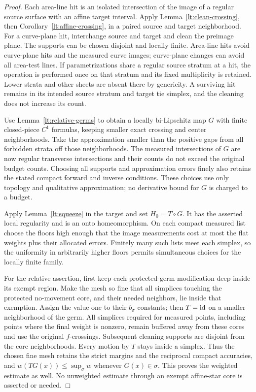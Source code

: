 \begin{proof}
Each area-line hit is an isolated intersection of the image of a
regular source surface with an affine target interval.  Apply
Lemma~\ref{lt:clean-crossing}, then Corollary~\ref{lt:affine-crossing},
in a paired source and target neighborhood.  For a curve-plane hit,
interchange source and target and clean the preimage plane.  The
supports can be chosen disjoint and locally finite.  Area-line hits
avoid curve-plane hits and the measured curve images; curve-plane
changes can avoid all area-test lines.  If parametrizations share a
regular source stratum at a hit, the operation is performed once on
that stratum and its fixed multiplicity is retained.  Lower strata
and other sheets are absent there by genericity.  A surviving hit
remains in its intended source stratum and target tie simplex, and
the cleaning does not increase its count.

Use Lemma~\ref{lt:relative-germs} to obtain a locally bi-Lipschitz
map $G$ with finite closed-piece $C^1$ formulas, keeping smaller
exact crossing and center neighborhoods.  Take the approximation
smaller than the positive gaps from all forbidden strata off those
neighborhoods.  The measured intersections of $G$ are now regular
transverse intersections and their counts do not exceed the
original budget counts.  Choosing all supports and approximation
errors finely also retains the stated compact forward and inverse
conditions.  These choices use only topology and qualitative
approximation; no derivative bound for $G$ is charged to a budget.

Apply Lemma~\ref{lt:squeeze} in the target and set $H_0=T\circ G$.
It has the asserted local regularity and is an onto homeomorphism.
On each compact measured list choose the floors high enough that
the image measurements cost at most the flat weights plus their
allocated errors.  Finitely many such lists meet each simplex, so
the uniformity in arbitrarily higher floors permits simultaneous
choices for the locally finite family.

For the relative assertion, first keep each protected-germ modification
deep inside its exempt region.  Make the mesh so fine that all
simplices touching the protected no-movement core, and their needed
neighbors, lie inside that exemption.  Assign the value one to
their $b_\sigma$ constants; then $T=\operatorname{id}$ on a smaller neighborhood
of the germ.  All simplices required for measured points, including
points where the final weight is nonzero, remain buffered away
from these cores and use the original $f$-crossings.  Subsequent
cleaning supports are disjoint from the core neighborhoods.
Every motion by $T$ stays inside a simplex.  Thus the chosen fine
mesh retains the strict margins and the reciprocal compact
accuracies, and $w(TG(x))\leq\sup_\sigma w$ whenever $G(x)\in\sigma$.
This proves the weighted estimate as well.  No unweighted estimate
through an exempt affine-star core is asserted or needed.
\end{proof}

